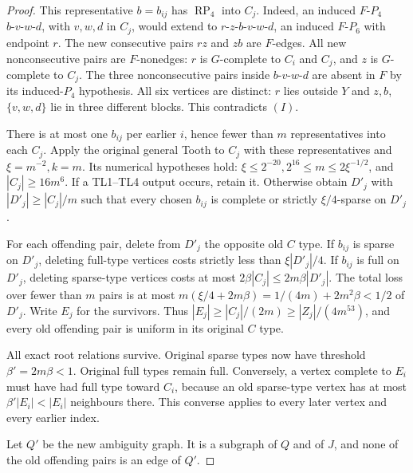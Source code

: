 \documentclass[11pt,a4paper]{article}
\theoremstyle{definition}
\theoremstyle{remark}
\numberwithin{equation}{section}
\begin{document}
\begin{proof}
This representative \(b=b_{ij}\) has \(\operatorname{RP}_{4}\) into \(C_{j}\). Indeed, an induced \(F\text{-}P_{4}\) \(b\text{-}v\text{-}w\text{-}d\), with \(v,\allowbreak w,\allowbreak d\) in \(C_{j}\), would extend to \(r\text{-}z\text{-}b\text{-}v\text{-}w\text{-}d\), an induced \(F\text{-}P_{6}\) with endpoint \(r\). The new consecutive pairs \(rz\) and \(zb\) are \(F\)-edges. All new nonconsecutive pairs are \(F\)-nonedges: \(r\) is \(G\)-complete to \(C_{i}\) and \(C_{j}\), and \(z\) is \(G\)-complete to \(C_{j}\). The three nonconsecutive pairs inside \(b\text{-}v\text{-}w\text{-}d\) are absent in \(F\) by its induced-\(P_{4}\) hypothesis. All six vertices are distinct: \(r\) lies outside \(Y\) and \(z,\allowbreak b\),\(\{v,\allowbreak w,\allowbreak d\}\) lie in three different blocks. This contradicts \((I)\).

There is at most one \(b_{ij}\) per earlier \(i\), hence fewer than \(m\) representatives into each \(C_{j}\). Apply the original general Tooth to \(C_{j}\) with these representatives and \(\xi=m^{-2},\allowbreak  k=m\). Its numerical hypotheses hold: \(\xi\le\allowbreak 2^{-20},\allowbreak  2^{16}\le\allowbreak m\le\allowbreak 2\xi^{-1/2}\), and \(|C_{j}|\ge\allowbreak 16m^{6}\). If a TL1--TL4 output occurs, retain it. Otherwise obtain \(D'_{j}\) with \(|D'_{j}|\ge\allowbreak |C_{j}|/m\) such that every chosen \(b_{ij}\) is complete or strictly \(\xi/4\)-sparse on \(D'_{j}\).

For each offending pair, delete from \(D'_{j}\) the opposite old \(C\) type. If \(b_{ij}\) is sparse on \(D'_{j}\), deleting full-type vertices costs strictly less than \(\xi |D'_{j}|/4\). If \(b_{ij}\) is full on \(D'_{j}\), deleting sparse-type vertices costs at most \(2 \beta |C_{j}| \le\allowbreak  2m \beta |D'_{j}|\). The total loss over fewer than \(m\) pairs is at most \(m(\xi/4+2m \beta) =1/(4m)+2m^{2} \beta < 1/2\) of \(D'_{j}\). Write \(E_{j}\) for the survivors. Thus \(|E_{j}|\ge\allowbreak |C_{j}|/(2m)\ge\allowbreak |Z_{j}|/(4m^{53})\), and every old offending pair is uniform in its original \(C\) type.

All exact root relations survive. Original sparse types now have threshold \(\beta'=2m \beta <1\). Original full types remain full. Conversely, a vertex complete to \(E_{i}\) must have had full type toward \(C_{i}\), because an old sparse-type vertex has at most \(\beta' |E_{i}|<|E_{i}|\) neighbours there. This converse applies to every later vertex and every earlier index.

Let \(Q'\) be the new ambiguity graph. It is a subgraph of \(Q\) and of \(J\), and none of the old offending pairs is an edge of \(Q'\).

\end{proof}
\end{document}
